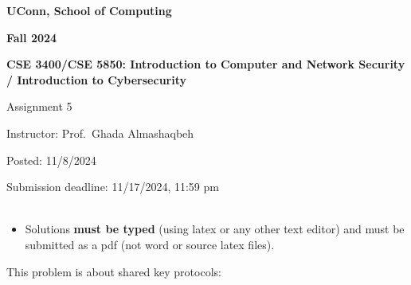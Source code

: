 \documentclass[12pt]{article}
\newcommand{\handout}[2]{
\renewcommand{\thepage}{\footnotesize CSE 3400/CSE 5850, #1, p. \arabic{page}}
\begin{center}

\noindent
{\bf UConn, School of Computing}

\noindent
{\bf Fall 2024}

\noindent
{\bf CSE 3400/CSE 5850: Introduction to Computer and Network Security \\ / Introduction to Cybersecurity}
\end{center}

\begin{center}
{\Large #1}
\end{center}
}
\begin{document}
\handout{Assignment 5}{}

\noindent
{Instructor: Prof.~Ghada Almashaqbeh}

\noindent
{Posted: 11/8/2024}

\noindent
{Submission deadline: 11/17/2024, 11:59 pm} \\\\

\begin{itemize}
\item Solutions {\bf must be typed} (using latex or any other text editor) and must be submitted as a pdf (not word or source latex files).
\end{itemize}

This problem is about shared key protocols:
\end{document}
